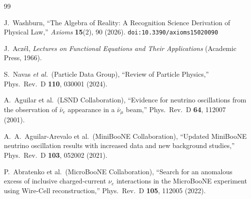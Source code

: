 \documentclass[12pt,a4paper]{article}
\theoremstyle{definition}
\theoremstyle{remark}
\begin{document}
\begin{thebibliography}{99}

J.~Washburn, ``The Algebra of Reality: A Recognition Science Derivation
of Physical Law,'' \emph{Axioms} \textbf{15}(2), 90 (2026).
\texttt{doi:10.3390/axioms15020090}

J.~Acz\'el, \emph{Lectures on Functional Equations and Their
Applications} (Academic Press, 1966).

S.~Navas \textit{et al.}\ (Particle Data Group),
``Review of Particle Physics,'' Phys.\ Rev.\ D \textbf{110}, 030001 (2024).

A.~Aguilar et al.\ (LSND Collaboration),
``Evidence for neutrino oscillations from the observation of
$\bar\nu_e$ appearance in a $\bar\nu_\mu$ beam,''
Phys.\ Rev.\ D \textbf{64}, 112007 (2001).

A.~A.~Aguilar-Arevalo et al.\ (MiniBooNE Collaboration),
``Updated MiniBooNE neutrino oscillation results with increased data
and new background studies,''
Phys.\ Rev.\ D \textbf{103}, 052002 (2021).

P.~Abratenko et al.\ (MicroBooNE Collaboration),
``Search for an anomalous excess of inclusive charged-current
$\nu_e$ interactions in the MicroBooNE experiment using Wire-Cell
reconstruction,''
Phys.\ Rev.\ D \textbf{105}, 112005 (2022).

\end{thebibliography}
\end{document}
